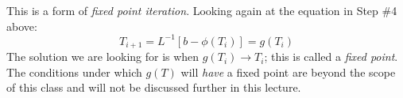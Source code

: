 This is a form of \emph{fixed point iteration}. Looking again at the equation in Step \#4 above:
\begin{equation*}
T_{i+1} = L^{-1}\left[b-\phi(T_{i})\right] = g(T_i)
\end{equation*}
The solution we are looking for is when $g(T_i) \rightarrow T_i$; this is called a \emph{fixed point}.  The conditions under which $g(T)$ will \emph{have} a fixed point are beyond the scope of this class and will not be discussed further in this lecture.

